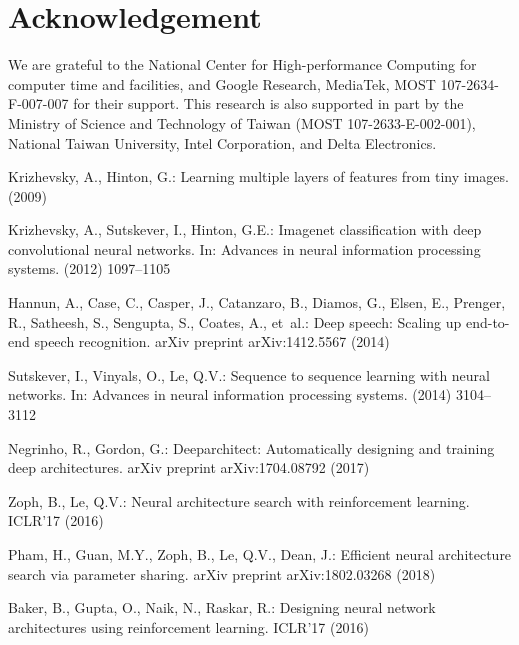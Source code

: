 \documentclass[runningheads]{llncs}
\begin{document}
\section{Acknowledgement}
We are grateful to the National Center for High-performance Computing for computer time and facilities, and Google Research, MediaTek, MOST 107-2634-F-007-007 for their support. This research is also supported in part by the Ministry of Science and Technology of Taiwan (MOST 107-2633-E-002-001), National Taiwan University, Intel Corporation, and Delta Electronics.

\begin{thebibliography}{10}

Krizhevsky, A., Hinton, G.:
\newblock Learning multiple layers of features from tiny images.
\newblock (2009)

Krizhevsky, A., Sutskever, I., Hinton, G.E.:
\newblock Imagenet classification with deep convolutional neural networks.
\newblock In: Advances in neural information processing systems. (2012)
  1097--1105

Hannun, A., Case, C., Casper, J., Catanzaro, B., Diamos, G., Elsen, E.,
  Prenger, R., Satheesh, S., Sengupta, S., Coates, A.,  et~al.:
\newblock Deep speech: Scaling up end-to-end speech recognition.
\newblock arXiv preprint arXiv:1412.5567 (2014)

Sutskever, I., Vinyals, O., Le, Q.V.:
\newblock Sequence to sequence learning with neural networks.
\newblock In: Advances in neural information processing systems. (2014)
  3104--3112

Negrinho, R., Gordon, G.:
\newblock Deeparchitect: Automatically designing and training deep
  architectures.
\newblock arXiv preprint arXiv:1704.08792 (2017)

Zoph, B., Le, Q.V.:
\newblock Neural architecture search with reinforcement learning.
\newblock ICLR'17 (2016)

Pham, H., Guan, M.Y., Zoph, B., Le, Q.V., Dean, J.:
\newblock Efficient neural architecture search via parameter sharing.
\newblock arXiv preprint arXiv:1802.03268 (2018)

Baker, B., Gupta, O., Naik, N., Raskar, R.:
\newblock Designing neural network architectures using reinforcement learning.
\newblock ICLR'17 (2016)


\end{thebibliography}
\end{document}
